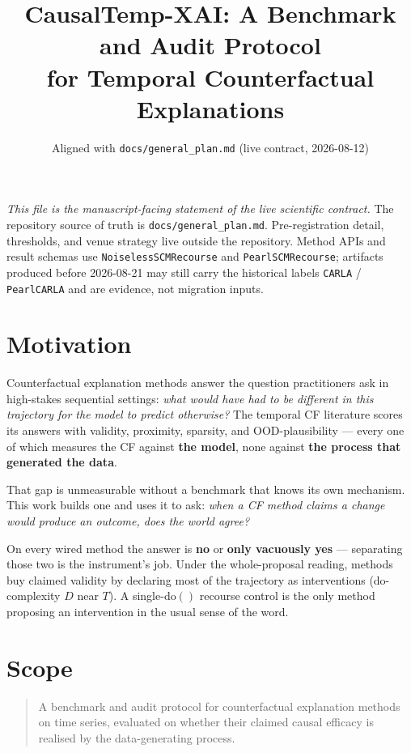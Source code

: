 \documentclass[11pt]{article}
\title{CausalTemp-XAI: A Benchmark and Audit Protocol\\
       for Temporal Counterfactual Explanations}
\author{}
\date{Aligned with \texttt{docs/general\_plan.md} (live contract, 2026-08-12)}
\begin{document}
\maketitle

\noindent\textit{This file is the manuscript-facing statement of the live
scientific contract.} The repository source of truth is
\texttt{docs/general\_plan.md}. Pre-registration detail, thresholds, and
venue strategy live outside the repository. Method APIs and result schemas
use \texttt{NoiselessSCMRecourse} and \texttt{PearlSCMRecourse}; artifacts
produced before 2026-08-21 may still carry the historical labels
\texttt{CARLA} / \texttt{PearlCARLA} and are evidence, not migration inputs.

\section{Motivation}

Counterfactual explanation methods answer the question practitioners ask in
high-stakes sequential settings: \emph{what would have had to be different
in this trajectory for the model to predict otherwise?} The temporal CF
literature scores its answers with validity, proximity, sparsity, and
OOD-plausibility --- every one of which measures the CF against
\textbf{the model}, none against \textbf{the process that generated the
data}.

That gap is unmeasurable without a benchmark that knows its own mechanism.
This work builds one and uses it to ask: \emph{when a CF method claims a
change would produce an outcome, does the world agree?}

On every wired method the answer is \textbf{no} or \textbf{only vacuously
yes} --- separating those two is the instrument's job. Under the
whole-proposal reading, methods buy claimed validity by declaring most of
the trajectory as interventions (do-complexity $D$ near $T$). A
single-$\mathrm{do}()$ recourse control is the only method proposing an
intervention in the usual sense of the word.

\section{Scope}

\begin{quote}
A benchmark and audit protocol for counterfactual explanation methods on
time series, evaluated on whether their claimed causal efficacy is realised
by the data-generating process.
\end{quote}
\end{document}
